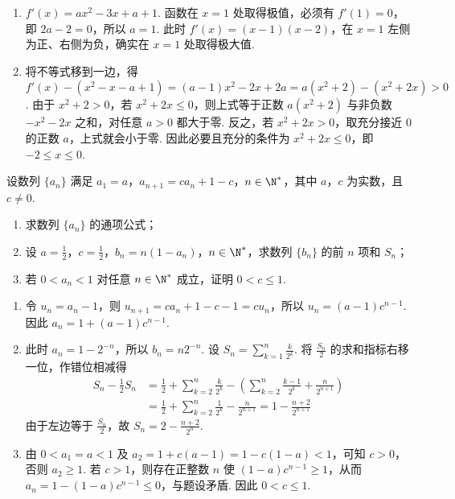 \begin{solution}
\begin{enumerate}
\item \(f'(x)=ax^2-3x+a+1\). 函数在 \(x=1\) 处取得极值，必须有 \(f'(1)=0\)，即 \(2a-2=0\)，所以 \(a=1\). 此时 \(f'(x)=(x-1)(x-2)\)，在 \(x=1\) 左侧为正、右侧为负，确实在 \(x=1\) 处取得极大值.
\item 将不等式移到一边，得 \(f'(x)-\left(x^2-x-a+1\right)=(a-1)x^2-2x+2a=a(x^2+2)-(x^2+2x)>0\). 由于 \(x^2+2>0\)，若 \(x^2+2x\leqslant0\)，则上式等于正数 \(a(x^2+2)\) 与非负数 \(-x^2-2x\) 之和，对任意 \(a>0\) 都大于零. 反之，若 \(x^2+2x>0\)，取充分接近 \(0\) 的正数 \(a\)，上式就会小于零. 因此必要且充分的条件为 \(x^2+2x\leqslant0\)，即 \(-2\leqslant x\leqslant0\).
\end{enumerate}
\end{solution}

\begin{problem}
设数列 \(\{a_{n}\}\) 满足 \(a_1 = a\)，\(a_{n+1} = c a_n + 1 - c\)，\(n \in \N^*\)，其中 \(a\)，\(c\) 为实数，且 \(c \neq 0\).

\begin{enumerate}
\item 求数列 \(\{a_{n}\}\) 的通项公式；
\item 设 \(a = \frac{1}{2}\)，\(c = \frac{1}{2}\)，\(b_n = n(1 - a_n)\)，\(n \in \N^*\)，求数列 \(\{b_n\}\) 的前 \(n\) 项和 \(S_n\)；
\item 若 \(0 < a_{n} < 1\) 对任意 \(n \in \N^{*}\) 成立，证明 \(0 < c \leqslant 1\).
\end{enumerate}
\end{problem}

\begin{solution}
\begin{enumerate}
\item 令 \(u_n=a_n-1\)，则 \(u_{n+1}=ca_n+1-c-1=cu_n\)，所以 \(u_n=(a-1)c^{n-1}\). 因此 \(a_n=1+(a-1)c^{n-1}\).
\item 此时 \(a_n=1-2^{-n}\)，所以 \(b_n=n2^{-n}\). 设 \(S_n=\sum_{k=1}^n \frac{k}{2^k}\). 将 \(\frac{S_n}{2}\) 的求和指标右移一位，作错位相减得
\[
\begin{aligned}
S_n-\frac12S_n
&=\frac12+\sum_{k=2}^{n}\frac{k}{2^k}-\left(\sum_{k=2}^{n}\frac{k-1}{2^k}+\frac{n}{2^{n+1}}\right)\\
&=\frac12+\sum_{k=2}^{n}\frac1{2^k}-\frac{n}{2^{n+1}}=1-\frac{n+2}{2^{n+1}}
\end{aligned}
\]
由于左边等于 \(\frac{S_n}{2}\)，故 \(S_n=2-\frac{n+2}{2^n}\).
\item 由 \(0<a_1=a<1\) 及 \(a_2=1+c(a-1)=1-c(1-a)<1\)，可知 \(c>0\)，否则 \(a_2\geqslant1\). 若 \(c>1\)，则存在正整数 \(n\) 使 \((1-a)c^{n-1}\geqslant1\)，从而 \(a_n=1-(1-a)c^{n-1}\leqslant0\)，与题设矛盾. 因此 \(0<c\leqslant1\).
\end{enumerate}
\end{solution}

